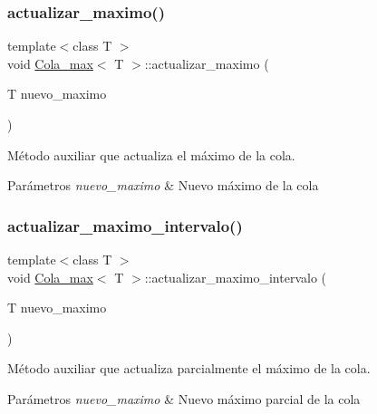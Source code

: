 \subsubsection{\texorpdfstring{actualizar\+\_\+maximo()}{actualizar\_maximo()}\hspace{0.1cm}{\footnotesize\ttfamily [2/2]}}
{\footnotesize\ttfamily template$<$class T $>$ \\
void \hyperlink{classCola__max}{Cola\+\_\+max}$<$ T $>$\+::actualizar\+\_\+maximo (\begin{DoxyParamCaption}\item[{T}]{nuevo\+\_\+maximo }\end{DoxyParamCaption})\hspace{0.3cm}{\ttfamily [private]}}



Método auxiliar que actualiza el máximo de la cola. 


\begin{DoxyParams}{Parámetros}
{\em nuevo\+\_\+maximo} & Nuevo máximo de la cola \\
\hline
\end{DoxyParams}
\mbox{\label{classCola__max_a514a99c8c65ea41f9f28d56a9db1c6c6}} 
\subsubsection{\texorpdfstring{actualizar\+\_\+maximo\+\_\+intervalo()}{actualizar\_maximo\_intervalo()}\hspace{0.1cm}{\footnotesize\ttfamily [1/2]}}
{\footnotesize\ttfamily template$<$class T $>$ \\
void \hyperlink{classCola__max}{Cola\+\_\+max}$<$ T $>$\+::actualizar\+\_\+maximo\+\_\+intervalo (\begin{DoxyParamCaption}\item[{T}]{nuevo\+\_\+maximo }\end{DoxyParamCaption})\hspace{0.3cm}{\ttfamily [private]}}



Método auxiliar que actualiza parcialmente el máximo de la cola. 


\begin{DoxyParams}{Parámetros}
{\em nuevo\+\_\+maximo} & Nuevo máximo parcial de la cola \\
\hline
\end{DoxyParams}
\mbox{\label{classCola__max_a514a99c8c65ea41f9f28d56a9db1c6c6}} 
